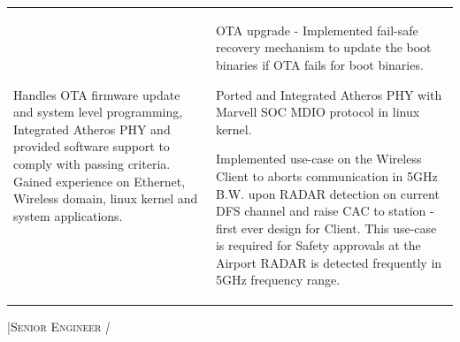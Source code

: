 \begingroup
\setlength{\tabcolsep}{5pt} %
\indent\begin{tabularx}{\textwidth}{p{} p{\RIGHTCOLUMNWIDTH}} %
   Handles OTA firmware update and system level programming, Integrated Atheros PHY and provided software support to comply with  passing criteria.
   Gained experience on Ethernet, Wireless domain, linux kernel and system applications.
         &
        \vspace{-\topsep}\vspace{2pt} \begin{myitemize}
    \footnotesize {
    \item \noindent OTA upgrade - Implemented fail-safe recovery mechanism to update the boot binaries if OTA fails for boot binaries.
    \item \noindent Ported and Integrated Atheros PHY with Marvell SOC \textendash{} MDIO protocol in linux kernel.
    \item \noindent Implemented use-case on the Wireless Client to aborts communication in 5GHz B.W. upon RADAR detection on current DFS channel and raise CAC to station - first ever design for Client. This use-case is required for Safety approvals at the Airport RADAR is detected frequently in 5GHz frequency range.
    }
   \end{myitemize}\vspace{-\topsep}%
\end{tabularx}
\sectionsep       %
%
%
%
%
\vspace{-9pt}
{\noindent \large{\textsc{\textbf{\CompanyII} |Senior Engineer}}}\newline%
{\noindent \color{ltgrey}\small{\textit{\CompanyIIExp{} | \CompanyIILoc{}}}}\newline%

